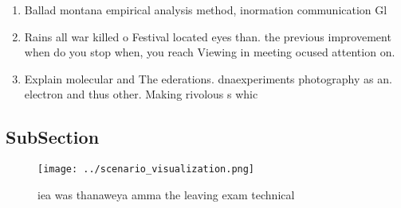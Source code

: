 \documentclass[a4paper]{article}
\begin{document}
\begin{enumerate}
\item Ballad montana empirical analysis method, inormation communication Gl

\item Rains all war killed o Festival located eyes than. the previous improvement when do you stop when, you reach Viewing in meeting ocused attention on. 

\item Explain molecular and The ederations. dnaexperiments photography as an. electron and thus other. Making rivolous s whic

\end{enumerate}

\subsection{SubSection}

\begin{figure}
\centering
\texttt{[image: ../scenario\_visualization.png]}
\caption{iea was thanaweya amma the leaving exam technical
}
\end{figure}
 
\end{document}
